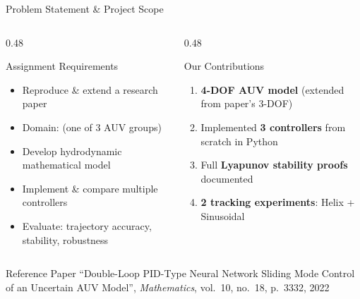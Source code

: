 \documentclass[aspectratio=169,10pt]{beamer}
\begin{document}
\begin{frame}{Problem Statement \& Project Scope}

\begin{columns}[T]
\begin{column}{0.48\textwidth}
  \begin{block}{Assignment Requirements}
    \begin{itemize}
      \item Reproduce \& extend a research paper
      \item Domain:  (one of 3 AUV groups)
      \item Develop hydrodynamic mathematical model
      \item Implement \& compare multiple controllers
      \item Evaluate: trajectory accuracy, stability, robustness
    \end{itemize}
  \end{block}
  \vspace{6pt}
\end{column}
\begin{column}{0.48\textwidth}
  \begin{exampleblock}{Our Contributions}
    \begin{enumerate}
      \item[\textcolor{cyancol}{\textbf{1.}}]
        \textbf{4-DOF AUV model} (extended from paper's 3-DOF)
      \item[\textcolor{cyancol}{\textbf{2.}}]
        Implemented \textbf{3 controllers} from scratch in Python
      \item[\textcolor{cyancol}{\textbf{4.}}]
        Full \textbf{Lyapunov stability proofs} documented
      \item[\textcolor{cyancol}{\textbf{5.}}]
        \textbf{2 tracking experiments}: Helix + Sinusoidal
    \end{enumerate}
  \end{exampleblock}
  \end{column}
\end{columns}
  \vspace{6pt}
  \begin{block}{Reference Paper}
  \centering
    \small
    ``Double-Loop PID-Type Neural Network Sliding Mode Control
    of an Uncertain AUV Model'',
    \textit{Mathematics}, vol.~10, no.~18, p.~3332, 2022
  \end{block}

\end{frame}
\end{document}
